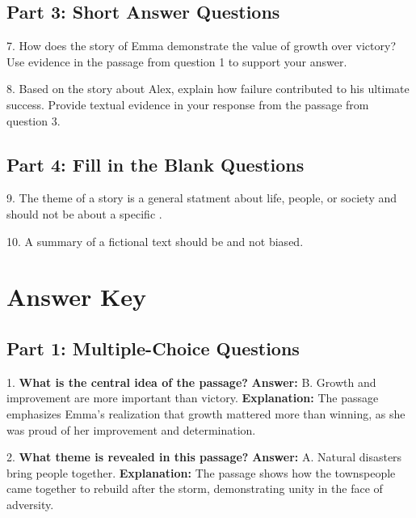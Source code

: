 \documentclass[12pt]{article}
\begin{document}
\subsection*{Part 3: Short Answer Questions}

7. How does the story of Emma demonstrate the value of growth over victory? Use evidence in the passage from question 1 to support your answer.  
\vspace{4cm}

8. Based on the story about Alex, explain how failure contributed to his ultimate success. Provide textual evidence in your response from the passage from question 3.  
\vspace{4cm}

\subsection*{Part 4: Fill in the Blank Questions}

9. The theme of a story is a general statment about life, people, or society and should not be about a specific \underline{\hspace{4cm}} .
\vspace{2cm}

10. A summary of a fictional text should be\underline{\hspace{4cm}} and not biased.
\vspace{2cm}
\newpage
\section*{Answer Key}

\subsection*{Part 1: Multiple-Choice Questions}

1. \textbf{What is the central idea of the passage?}  
\textbf{Answer:} B. Growth and improvement are more important than victory.  
\textbf{Explanation:} The passage emphasizes Emma’s realization that growth mattered more than winning, as she was proud of her improvement and determination.

\vspace{1cm}
2. \textbf{What theme is revealed in this passage?}  
\textbf{Answer:} A. Natural disasters bring people together.  
\textbf{Explanation:} The passage shows how the townspeople came together to rebuild after the storm, demonstrating unity in the face of adversity.
\end{document}
